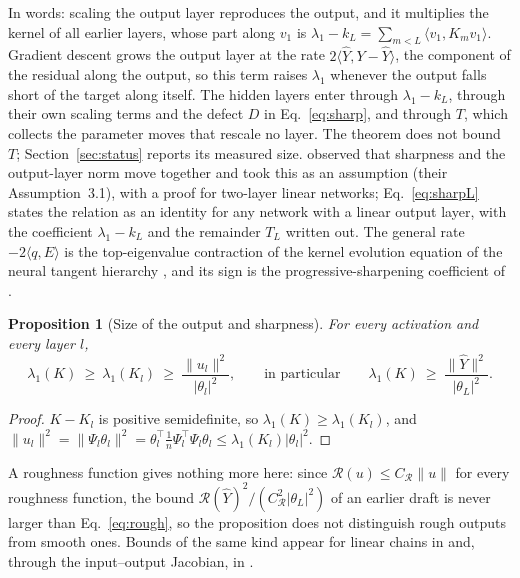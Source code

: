\documentclass[11pt]{article}
\newtheorem{proposition}{Proposition}
\theoremstyle{definition}
\theoremstyle{remark}
\newcommand{\Rgh}{\mathcal{R}}
\newcommand{\CR}{C_{\Rgh}}
\newcommand{\ip}[2]{\langle #1,#2\rangle}
\begin{document}
In words: scaling the output layer reproduces the output, and it multiplies the kernel of all earlier layers, whose part along $v_1$ is $\lambda_1 - k_L = \sum_{m<L}\ip{v_1}{K_mv_1}$.
Gradient descent grows the output layer at the rate $2\ip{\hat Y}{Y - \hat Y}$, the component of the residual along the output, so this term raises $\lambda_1$ whenever the output falls short of the target along itself.
The hidden layers enter through $\lambda_1 - k_L$, through their own scaling terms and the defect $D$ in Eq.~\eqref{eq:sharp}, and through $T$, which collects the parameter moves that rescale no layer.
The theorem does not bound $T$; Section~\ref{sec:status} reports its measured size.
\cite{liwangli2022} observed that sharpness and the output-layer norm move together and took this as an assumption (their Assumption~3.1), with a proof for two-layer linear networks; Eq.~\eqref{eq:sharpL} states the relation as an identity for any network with a linear output layer, with the coefficient $\lambda_1 - k_L$ and the remainder $T_L$ written out. The general rate $-2\ip{q}{E}$ is the top-eigenvalue contraction of the kernel evolution equation of the neural tangent hierarchy \cite{huangyau2020}, and its sign is the progressive-sharpening coefficient of \cite{damian2023}.

\begin{proposition}[Size of the output and sharpness]\label{prop:rough}
For every activation and every layer $l$,
\begin{equation}\label{eq:rough}
\lambda_1(K)\ \ge\ \lambda_1(K_l)\ \ge\ \frac{\|u_l\|^2}{|\theta_l|^2},\qquad\text{in particular}\qquad \lambda_1(K)\ \ge\ \frac{\|\hat Y\|^2}{|\theta_L|^2}.
\end{equation}
\end{proposition}

\begin{proof}
$K - K_l$ is positive semidefinite, so $\lambda_1(K)\ge\lambda_1(K_l)$, and $\|u_l\|^2 = \|\Psi_l\theta_l\|^2 = \theta_l^\top\frac1n\Psi_l^\top\Psi_l\theta_l \le \lambda_1(K_l)|\theta_l|^2$.
\end{proof}

A roughness function gives nothing more here: since $\Rgh(u)\le\CR\|u\|$ for every roughness function, the bound $\Rgh(\hat Y)^2/(\CR^2|\theta_L|^2)$ of an earlier draft is never larger than Eq.~\eqref{eq:rough}, so the proposition does not distinguish rough outputs from smooth ones.
Bounds of the same kind appear for linear chains in \cite{yoo2025} and, through the input--output Jacobian, in \cite{maying2021,macdonald2023}.
\end{document}
